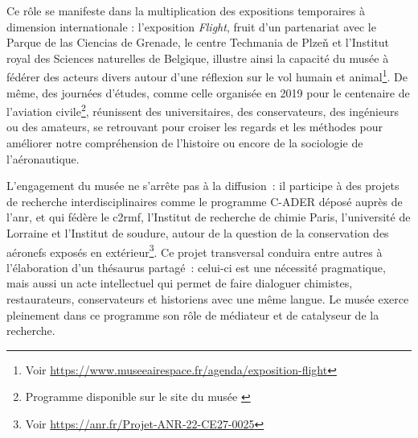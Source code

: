 Ce rôle se manifeste dans la multiplication des expositions temporaires à dimension internationale : l’exposition \emph{Flight}, fruit d’un partenariat avec le Parque de las Ciencias de Grenade, le centre Techmania de Plzeň et l’Institut royal des Sciences naturelles de Belgique, illustre ainsi la capacité du musée à fédérer des acteurs divers autour d’une réflexion sur le vol humain et animal\footnote{Voir \href{https://www.museeairespace.fr/agenda/exposition-flight}{https://www.museeairespace.fr/agenda/exposition-flight}}. De même, des journées d’études, comme celle organisée en 2019 pour le centenaire de l’aviation civile\footnote{Programme disponible sur le site du musée \cite{19192019CentAns}}, réunissent des universitaires, des conservateurs, des ingénieurs ou des amateurs, se retrouvant pour croiser les regards et les méthodes pour améliorer notre compréhension de l'histoire ou encore de la sociologie de l'aéronautique.

L’engagement du musée ne s’arrête pas à la diffusion : il participe à des projets de recherche interdisciplinaires comme le programme C-ADER déposé auprès de l'\ac{anr}, et qui fédère le \ac{c2rmf}, l’Institut de recherche de chimie Paris, l’université de Lorraine et l’Institut de soudure, autour de la  question de la conservation des aéronefs exposés en extérieur\footnote{Voir  \href{https://anr.fr/Projet-ANR-22-CE27-0025}{https://anr.fr/Projet-ANR-22-CE27-0025}}. Ce projet transversal conduira entre autres à l’élaboration d’un thésaurus partagé : celui-ci est une nécessité pragmatique, mais aussi un acte intellectuel qui permet de faire dialoguer chimistes, restaurateurs, conservateurs et historiens avec une même langue. Le musée exerce pleinement dans ce programme son rôle de médiateur et de catalyseur de la recherche.

